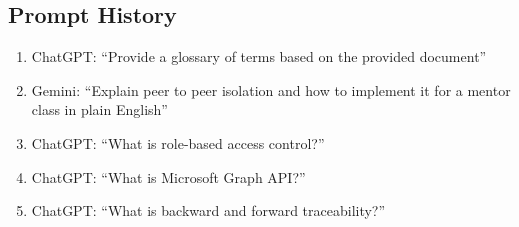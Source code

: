 \subsection{Prompt History}

\begin{enumerate}
    \item ChatGPT: ``Provide a glossary of terms based on the provided
    document''
    
    \item Gemini:  ``Explain peer to peer isolation and how to implement it for
    a mentor class in plain English''
    
    \item ChatGPT: ``What is role-based access control?''
    
    \item ChatGPT: ``What is Microsoft Graph API?''
    
    \item ChatGPT: ``What is backward and forward traceability?''
\end{enumerate}
